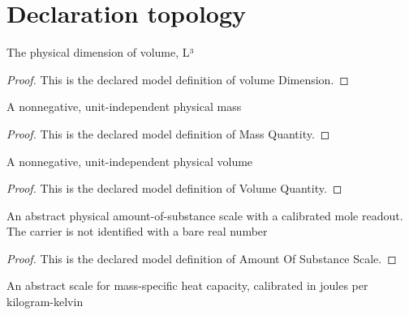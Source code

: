 \section{Declaration topology}
\begin{definition}
  \label{def:physics:phyx-mini-0406:phyxminiproblems-problemphyxmini0406-volumedimension}
  The physical dimension of volume, L³
\end{definition}
\begin{proof}
  This is the declared model definition of volume Dimension.
\end{proof}
\begin{definition}
  \label{def:physics:phyx-mini-0406:phyxminiproblems-problemphyxmini0406-massquantity}
  A nonnegative, unit-independent physical mass
\end{definition}
\begin{proof}
  This is the declared model definition of Mass Quantity.
\end{proof}
\begin{definition}
  \label{def:physics:phyx-mini-0406:phyxminiproblems-problemphyxmini0406-volumequantity}
  A nonnegative, unit-independent physical volume
\end{definition}
\begin{proof}
  This is the declared model definition of Volume Quantity.
\end{proof}
\begin{definition}
  \label{def:physics:phyx-mini-0406:phyxminiproblems-problemphyxmini0406-amountofsubstancescale}
  An abstract physical amount-of-substance scale with a calibrated mole readout. The carrier is not identified with a bare real number
\end{definition}
\begin{proof}
  This is the declared model definition of Amount Of Substance Scale.
\end{proof}
\begin{definition}
  \label{def:physics:phyx-mini-0406:phyxminiproblems-problemphyxmini0406-specificheatcapacityscale}
  An abstract scale for mass-specific heat capacity, calibrated in joules per kilogram-kelvin
\end{definition}
